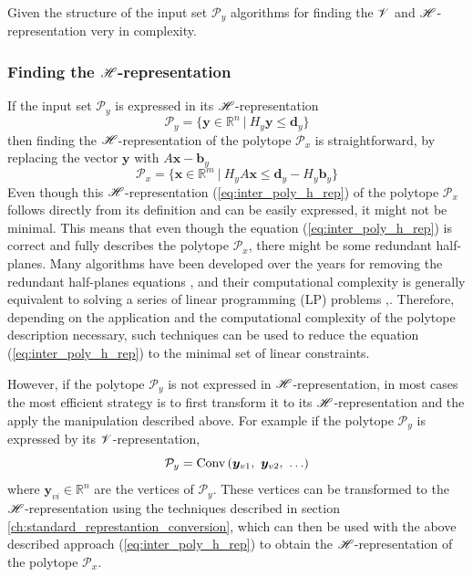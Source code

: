 Given the structure of the input set $\mathcal{P}_y$ algorithms for finding the $\mathscr{V}$ and $\mathscr{H}$-representation very in complexity. 

\subsubsection{Finding the $\mathscr{H}$-representation} 
\label{ch:inter_h_rep}
If the input set $\mathcal{P}_y$ is expressed in its $\mathscr{H}$-representation
\begin{equation}
    \mathcal{P}_y = \{ \bm{y}\in \mathbb{R}^n ~|~H_y\bm{y} \leq \bm{d}_y\}
\end{equation}
then finding the $\mathscr{H}$-representation of the polytope $\mathcal{P}_x$ is straightforward, by replacing the vector $\bm{y}$ with $A\bm{x} - \bm{b}_y$
\begin{equation}
    \mathcal{P}_x=\{\bm{x}\in  \mathbb{R}^m~|~ H_yA\bm{x} \leq \bm{d}_y -H_y\bm{b}_y \}
    \label{eq:inter_poly_h_rep}
\end{equation}
Even though this $\mathscr{H}$-representation (\ref{eq:inter_poly_h_rep}) of the polytope $\mathcal{P}_x$ follows directly from its definition and can be easily expressed, it might not be minimal. This means that even though the equation (\ref{eq:inter_poly_h_rep}) is correct and fully describes the polytope $\mathcal{P}_x$, there might be some redundant half-planes. Many algorithms have been developed over the years for removing the redundant half-planes equations \cite{Paulraj2006}, and their computational complexity is generally equivalent to solving a series of linear programming (LP) problems \cite{Telgen1983},\cite[Chapter 7.2]{fukuda2016lecture}. Therefore, depending on the application and the computational complexity of the polytope description necessary, such techniques can be used to reduce the equation (\ref{eq:inter_poly_h_rep}) to the minimal set of linear constraints.

However, if the polytope $\mathcal{P}_y$ is not expressed in $\mathscr{H}$-representation, in most cases the most efficient strategy is to first transform it to its $\mathscr{H}$-representation and the apply the manipulation described above. For example if the polytope $\mathcal{P}_y$ is expressed by its $\mathscr{V}$-representation, 
\begin{equation}
    \mathcal{P}_y = \text{Conv}\left( \bm{y}_{v1}, ~ \bm{y}_{v2},~ \ldots\right)
\end{equation}
where $\bm{y}_{vi} \in \mathbb{R}^n$ are the vertices of $\mathcal{P}_y$.  These vertices can be transformed to the $\mathscr{H}$-representation using the techniques described in section \ref{ch:standard_represtantion_conversion}, which can then be used with the above described approach (\ref{eq:inter_poly_h_rep}) to obtain the $\mathscr{H}$-representation of the polytope $\mathcal{P}_x$.


